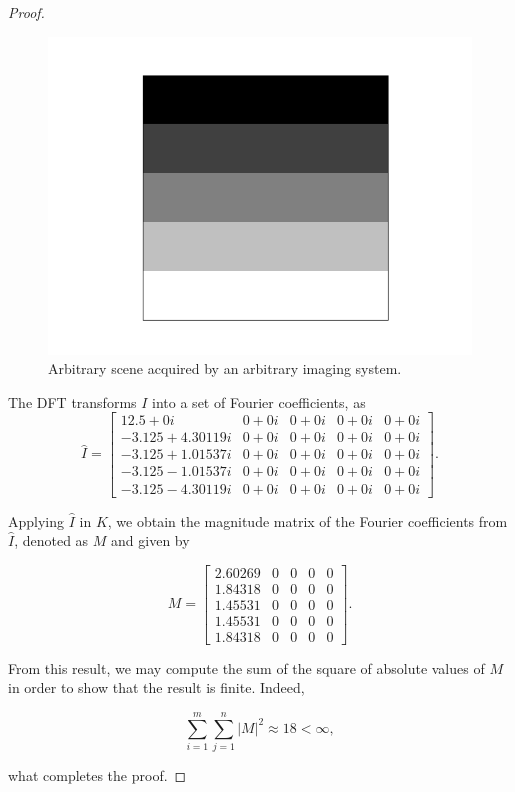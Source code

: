 \begin{theorem}{3}
\begin{proof}
\begin{figure}[ht]
    \centering
    \caption{Arbitrary scene acquired by an arbitrary imaging system.}
    \includegraphics[scale=0.5]{images/arbitrary_tiles.png}
    \fautor
\end{figure}

The DFT transforms $I$ into a set of Fourier coefficients, as
\[
\hat{I} = 
\begin{bmatrix}
    12.5 + 0i & 0 + 0i & 0 + 0i & 0 + 0i & 0 + 0i
    \\
    -3.125 + 4.30119i & 0 + 0i & 0 + 0i & 0 + 0i & 0 + 0i
    \\
    -3.125 + 1.01537i & 0 + 0i & 0 + 0i & 0 + 0i & 0 + 0i	
    \\
    -3.125 -1.01537i & 0 + 0i & 0 + 0i & 0 + 0i & 0 + 0i
    \\
    -3.125 -4.30119i & 0 + 0i & 0 + 0i & 0 + 0i & 0 + 0i
\end{bmatrix}.
\]

\noindent Applying $\hat{I}$ in $K$, we obtain the magnitude matrix of the Fourier coefficients from $\hat{I}$, denoted as $M$ and given by

\[
M = 
\begin{bmatrix}
    2.60269 & 0 & 0 & 0 & 0
    \\
    1.84318 & 0 & 0 & 0 & 0	
    \\
    1.45531 & 0 & 0 & 0 & 0	
    \\
    1.45531 & 0 & 0 & 0 & 0	
    \\
    1.84318 & 0 & 0 & 0 & 0	
\end{bmatrix}.
\]

\vspace{0.1in}

\noindent From this result, we may compute the sum of the square of absolute values of $M$ in order to show that the result is finite. Indeed,

\[
\sum_{i=1}^{m}\sum_{j=1}^{n}|M|^{2} \approx 18 < \infty,
\]

\noindent what completes the proof.
\end{proof}
\end{theorem}